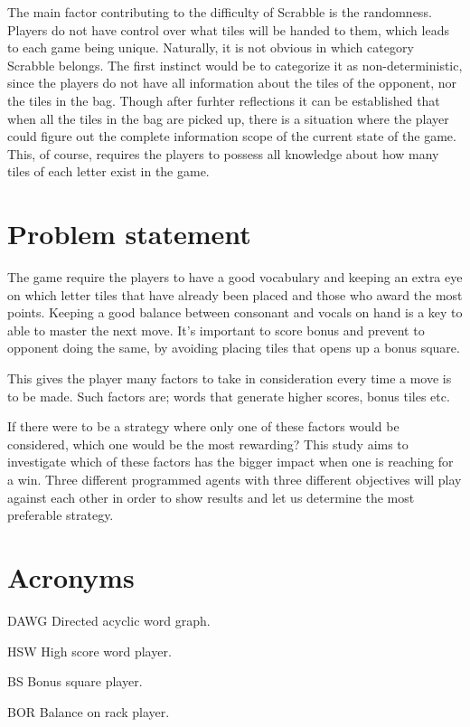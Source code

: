 \documentclass[a4paper, 12pt]{report}
\begin{document}
The main factor contributing to the difficulty of Scrabble is the randomness. Players do not have control over what tiles will be handed to them, which leads to each game being unique. Naturally, it is not obvious in which category Scrabble belongs. The first instinct would be to categorize it as non-deterministic, since the players do not have all information about the tiles of the opponent, nor the tiles in the bag. Though after furhter reflections it can be established that when all the tiles in the bag are picked up, there is a situation where the player could figure out the complete information scope of the current state of the game. This, of course, requires the players to possess all knowledge about how many tiles of each letter exist in the game.

\section{Problem statement}
The game require the players to have a good vocabulary and keeping an extra eye on which letter tiles that have already been placed and those who award the most points. Keeping a good balance between consonant and vocals on hand is a key to able to master the next move. It’s important to score bonus and prevent to opponent doing the same, by avoiding placing tiles that opens up a bonus square.

This gives the player many factors to take in consideration every time a move is to be made. Such factors are; words that generate higher scores, bonus tiles etc.

If there were to be a strategy where only one of these factors would be considered, which one would be the most rewarding? This study aims to investigate which of these factors has the bigger impact when one is reaching for a win. Three different programmed agents with three different objectives will play against each other in order to show results and let us determine the most preferable strategy.
\section {Acronyms}
\label{sec:acronyms}
\begin{description}
\item{DAWG} Directed acyclic word graph.
\item{HSW} High score word player.
\item{BS} Bonus square player.
\item{BOR} Balance on rack player.
\end{description}
\end{document}
